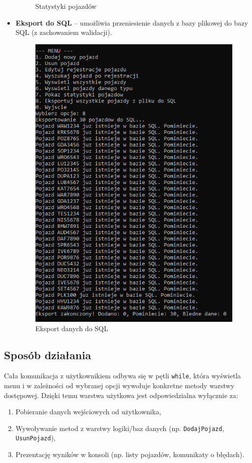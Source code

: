 \begin{itemize}
\begin{figure}[H]
        \caption{Statystyki pojazdów}
        \label{fig:moj_obrazek}
    \end{figure}
    \item \textbf{Eksport do SQL} -- umożliwia przeniesienie danych z bazy plikowej do bazy SQL 
    (z zachowaniem walidacji).
    \begin{figure}[H] 
        \centering
        \includegraphics[width=1\textwidth]{Eksport.png}
        \caption{Eksport danych do SQL}
        \label{fig:moj_obrazek}
    \end{figure}
\end{itemize}

\subsection{Sposób działania}
Cała komunikacja z użytkownikiem odbywa się w pętli \texttt{while}, która wyświetla menu 
i w zależności od wybranej opcji wywołuje konkretne metody warstwy dostępowej. 
Dzięki temu warstwa użytkowa jest odpowiedzialna wyłącznie za:
\begin{enumerate}
    \item Pobieranie danych wejściowych od użytkownika,
    \item Wywoływanie metod z warstwy logiki/baz danych (np. \texttt{DodajPojazd}, \texttt{UsunPojazd}),
    \item Prezentację wyników w konsoli (np. listy pojazdów, komunikaty o błędach).
\end{enumerate}

